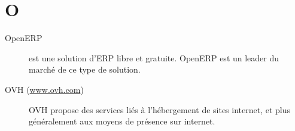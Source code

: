 \section{O}

\begin{description}

\item[OpenERP] est une solution d'ERP libre et gratuite. OpenERP est un leader
du marché de ce type de solution.

\item[OVH (\url{www.ovh.com})]
OVH propose des services liés à l'hébergement de sites internet, et plus 
généralement aux moyens de présence sur internet. 

\end{description}
